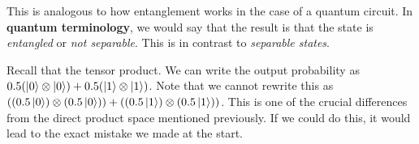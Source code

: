 \documentclass[runningheads]{llncs}
\begin{document}
This is analogous to how entanglement works in the case of a quantum circuit. In \textbf{quantum terminology}, we would say that the result is that the state is \textit{entangled} or \textit{not separable}. This is in contrast to \textit{separable states}.

Recall that the tensor product. We can write the output probability as $0.5(\ket{0} \otimes \ket{0}) + 0.5(\ket{1} \otimes \ket{1})$. Note that we cannot rewrite this as
$((0.5 \ket{0}) \otimes (0.5 \ket{0})) + ((0.5 \ket{1}) \otimes (0.5 \ket{1}))$. This is one of the crucial differences from the direct product space mentioned previously. If we could do this, it would lead to the exact mistake we made at the start.

%
%
%
%
\end{document}

